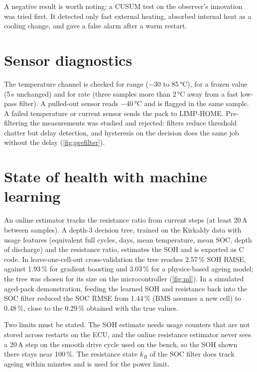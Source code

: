 A negative result is worth noting: a CUSUM test on the observer's innovation was tried first. It detected only fast external heating, absorbed internal heat as a cooling change, and gave a false alarm after a warm restart.


\section{Sensor diagnostics}
The temperature channel is checked for range ($-30$ to 85\,°C), for a frozen value (5\,s unchanged) and for rate (three samples more than 2\,°C away from a fast low-pass filter). A pulled-out sensor reads $-40$\,°C and is flagged in the same sample. A failed temperature or current sensor sends the pack to LIMP-HOME. Pre-filtering the measurements was studied and rejected: filters reduce threshold chatter but delay detection, and hysteresis on the decision does the same job without the delay (\cref{fig:prefilter}).


\section{State of health with machine learning}
An online estimator tracks the resistance ratio from current steps (at least 20\,A between samples). A depth-3 decision tree, trained on the Kirkaldy data with usage features (equivalent full cycles, days, mean temperature, mean SOC, depth of discharge) and the resistance ratio, estimates the SOH and is exported as C code. In leave-one-cell-out cross-validation the tree reaches 2.57\,\% SOH RMSE, against 1.93\,\% for gradient boosting and 3.03\,\% for a physics-based ageing model; the tree was chosen for its size on the microcontroller (\cref{fig:ml}). In a simulated aged-pack demonstration, feeding the learned SOH and resistance back into the SOC filter reduced the SOC RMSE from 1.44\,\% (BMS assumes a new cell) to 0.48\,\%, close to the 0.29\,\% obtained with the true values.

Two limits must be stated. The SOH estimate needs usage counters that are not stored across restarts on the ECU, and the online resistance estimator never sees a 20\,A step on the smooth drive cycle used on the bench, so the SOH shown there stays near 100\,\%. The resistance state $k_R$ of the SOC filter does track ageing within minutes and is used for the power limit.

